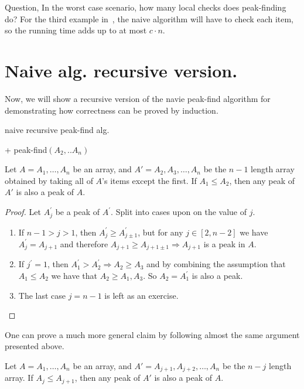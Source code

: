 Question, In the worst case scenario, how many local checks does peak-finding do? For the third example in~, the naive algorithm will have to check each item, so the running time adds up to at most $c \cdot n$.

\section{Naive alg. recursive version.}
Now, we will show a recursive version of the navie peak-find algorithm for demonstrating how correctness can be proved by induction. 
\begin{algorithm}[h]
\caption{naive recursive peak-find alg.}
  + peak-find$(A_{2}, .. A_{n})$
 \end{algorithm}

 \begin{claim} \label{claim:subarray} 
Let $A = A_1, \dots, A_n$ be an array, and $A' = A_2, A_3, \dots, A_n$ be the $n-1$ length array obtained by taking all of $A$'s items except the first. If $A_1 \le A_2$, then any peak of $A'$ is also a peak of $A$.
\end{claim}
\begin{proof} 
Let $A^{\prime}_{j}$ be a peak of $A^{\prime}$. Split into cases upon on the value of $j$.

\begin{enumerate}
  \item If $n-1 > j > 1$, then $A^{\prime}_{j} \ge A^{\prime}_{j \pm 1}$, but for any $j \in [2, n-2]$ we have $A^{\prime}_{j} = A_{j+1}$ and therefore $A_{j+1} \ge A_{j+1 \pm 1} \Rightarrow A_{j+1}$ is a peak in $A$.
  \item If $j^{\prime} = 1$, then $A^{\prime}_{1} > A^{\prime}_{2} \Rightarrow A_{2} \ge A_{3}$ and by combining the assumption that $A_{1} \le A_{2}$ we have that $A_{2} \ge A_{1}, A_{3}$. So $A_{2} = A^{\prime}_{1}$ is also a peak.
  \item The last case $j = n-1$ is left as an exercise.
\end{enumerate}
\end{proof}

One can prove a much more general claim by following almost the same argument presented above.

 \begin{claim} \label{claim:subarraymiddle} 
   Let $A = A_1, \dots, A_n$ be an array, and $A' = A_{j+1}, A_{j+2}, \dots, A_n$ be the $n-j$ length array. If $A_j \le A_{j+1}$, then any peak of $A'$ is also a peak of $A$.
\end{claim}

